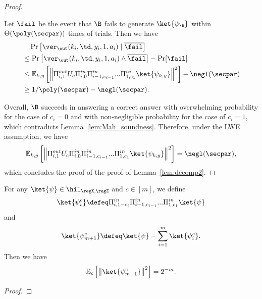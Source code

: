 \begin{proof}
\begin{itemize}
Let $\fail$ be the event that $\B$ fails to generate $\ket{\psi_{\B}}$ within $\Theta(\poly(\secpar))$ times of trials.
Then we have 
\begin{align*}
 &~~~\Pr\left[\ver_{\out}(k_i,\td,y_i,1,a_i) \mid \overline{\fail}\right]\\
 &\leq \Pr\left[\ver_{\out}(k_i,\td,y_i,1,a_i) \wedge \overline{\fail}\right]-\Pr[\fail]\\
 &\leq \mathbb{E}_{k,y}\left[\left\|\Pi_{i,1}^{out}U_c\Pi_{i,0}^{in}\Pi_{i-1,c_{i-1}}^{in}...\Pi_{1,c_1}^{in}\ket{\psi_{k,y}}\right\|^2\right]-\negl(\secpar)\\
 &\geq 1/\poly(\secpar)-\negl(\secpar).
\end{align*}
\end{itemize}

Overall, $\B$ succeeds in answering a correct answer with overwhelming probability for the case of $c_i=0$ and with non-negligible probability for the case of $c_i=1$, which contradicts Lemma~\ref{lem:Mah_soundness}.
Therefore, under the LWE assumption, we have
\begin{align*}
   \mathbb{E}_{k,y}\left[\left\|\Pi_{i,1}^{out}U_c\Pi_{i,0}^{in}\Pi_{i-1,c_{i-1}}^{in}...\Pi_{1,c_1}^{in}\ket{\psi_{k,y}}\right\|^2\right]=\negl(\secpar), 
\end{align*}
which concludes the proof of the proof of Lemma~\ref{lem:decomp2}.
\end{proof}

\begin{lemma}\label{lem:decomp3}
For any $\ket{\psi}\in \hil_{\regX,\regZ}$ %
and $c\in[m]$, we define
\begin{align*}
 \ket{\psi_i^{c}}\defeq \Pi_{i,1-c_i}^{in}\Pi_{i-1,c_{i-1}}^{in}...\Pi_{1,c_1}^{in}\ket{\psi} 
\end{align*}
and 
\begin{align*}
 \ket{\psi_{m+1}^{c}}\defeq \ket{\psi}-\sum_{i=1}^{m}\ket{\psi_{i}^{c}}.
\end{align*}
Then we have
\begin{align*}
 \mathbb{E}_{c}\left[\left\|\ket{\psi_{m+1}^{c}}\right\|^{2}\right]=2^{-m}.
\end{align*}
\end{lemma}
\begin{proof}
\end{proof}

